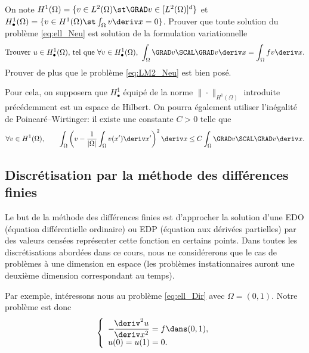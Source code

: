\documentclass[12pt,a4paper,twoside]{article}
\begin{document}
\begin{exercise}
  On note $H^1(\Omega) = \{ v \in L^2(\Omega) \st \GRAD v \in [L^2(\Omega)]^d \}$
  et $H_{\bullet}^1(\Omega) = \{ v \in H^1(\Omega) \st \int_{\Omega} v \deriv x = 0 \}$.
  Prouver que toute solution du probl\`eme \eqref{eq:ell_Neu}
  est solution de la formulation variationnelle
  \begin{align}
    \label{eq:LM2_Neu}
    \text{Trouver $u \in H_{\bullet}^1(\Omega)$, tel que $\forall v \in H_{\bullet}^1(\Omega)$, } 
    \int_{\Omega} \GRAD v \SCAL \GRAD v \deriv x = \int_{\Omega} f v \deriv x .
  \end{align}
  Prouver de plus que le probl\`eme \eqref{eq:LM2_Neu} est bien pos\'e.

  Pour cela, on supposera que $H_{\bullet}^1$ \'equip\'e de la norme $\| \cdot \|_{H^1(\Omega)}$
  introduite pr\'ec\'edemment est un espace de Hilbert.
  On pourra \'egalement utiliser l'in\'egalit\'e de Poincar\'e--Wirtinger:
  il existe une constante $C>0$ telle que
  \begin{equation*}
    \forall v \in H^1(\Omega) , \qquad
    \int_{\Omega} \left( v - \dfrac{1}{|\Omega|} \int_{\Omega} v(x') \deriv x' \right)^2
    \deriv x \leq C \int_{\Omega} \GRAD v \SCAL \GRAD v \deriv x .
  \end{equation*}
\end{exercise}
\subsection{Discr\'etisation par la m\'ethode des diff\'erences finies}
\label{subsec:ell_DF}

Le but de la m\'ethode des diff\'erences finies est d'approcher la solution 
d'une EDO (\'equation diff\'erentielle ordinaire) ou EDP
(\'equation aux d\'eriv\'ees partielles) par des valeurs cens\'ees repr\'esenter
cette fonction en certains points. Dans toutes les discr\'etisations abord\'ees dans ce cours,
nous ne consid\'ererons que le cas de probl\`emes \`a une dimension en espace
(les probl\`emes instationnaires auront une deuxi\`eme dimension correspondant au temps).

Par exemple, int\'eressons nous au probl\`eme \eqref{eq:ell_Dir} avec $\Omega = (0,1)$.
Notre probl\`eme est donc
\begin{equation}
  \label{eq:ell_1d}
  \left\{
    \begin{array}{l}
      - \dfrac{\!\deriv^2 u}{\!\deriv x^2} = f \dans (0,1) ,
      \\
      u(0) = u(1) = 0 .
    \end{array}
  \right.
\end{equation}
\end{document}
